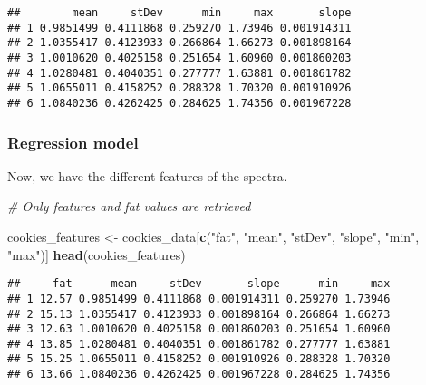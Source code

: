 \documentclass[
]{article}
\newenvironment{Shaded}{\begin{snugshade}}{\end{snugshade}}
\newcommand{\CommentTok}[1]{\textcolor[rgb]{0.56,0.35,0.01}{\textit{#1}}}
\newcommand{\DecValTok}[1]{\textcolor[rgb]{0.00,0.00,0.81}{#1}}
\newcommand{\FunctionTok}[1]{\textcolor[rgb]{0.13,0.29,0.53}{\textbf{#1}}}
\newcommand{\NormalTok}[1]{#1}
\newcommand{\OtherTok}[1]{\textcolor[rgb]{0.56,0.35,0.01}{#1}}
\newcommand{\SpecialCharTok}[1]{\textcolor[rgb]{0.81,0.36,0.00}{\textbf{#1}}}
\newcommand{\StringTok}[1]{\textcolor[rgb]{0.31,0.60,0.02}{#1}}
\begin{document}
\begin{verbatim}
##        mean     stDev      min     max       slope
## 1 0.9851499 0.4111868 0.259270 1.73946 0.001914311
## 2 1.0355417 0.4123933 0.266864 1.66273 0.001898164
## 3 1.0010620 0.4025158 0.251654 1.60960 0.001860203
## 4 1.0280481 0.4040351 0.277777 1.63881 0.001861782
## 5 1.0655011 0.4158252 0.288328 1.70320 0.001910926
## 6 1.0840236 0.4262425 0.284625 1.74356 0.001967228
\end{verbatim}

\subsubsection{Regression model}\label{regression-model}

Now, we have the different features of the spectra.

\begin{Shaded}
\begin{Highlighting}[]
\CommentTok{\# Only features and fat values are retrieved}

\NormalTok{cookies\_features }\OtherTok{\textless{}{-}}\NormalTok{ cookies\_data[}\FunctionTok{c}\NormalTok{(}\StringTok{"fat"}\NormalTok{, }\StringTok{"mean"}\NormalTok{, }\StringTok{"stDev"}\NormalTok{, }\StringTok{"slope"}\NormalTok{, }\StringTok{"min"}\NormalTok{, }\StringTok{"max"}\NormalTok{)]}
\FunctionTok{head}\NormalTok{(cookies\_features)}
\end{Highlighting}
\end{Shaded}

\begin{verbatim}
##     fat      mean     stDev       slope      min     max
## 1 12.57 0.9851499 0.4111868 0.001914311 0.259270 1.73946
## 2 15.13 1.0355417 0.4123933 0.001898164 0.266864 1.66273
## 3 12.63 1.0010620 0.4025158 0.001860203 0.251654 1.60960
## 4 13.85 1.0280481 0.4040351 0.001861782 0.277777 1.63881
## 5 15.25 1.0655011 0.4158252 0.001910926 0.288328 1.70320
## 6 13.66 1.0840236 0.4262425 0.001967228 0.284625 1.74356
\end{verbatim}

\begin{Shaded}
\end{Shaded}
\end{document}
